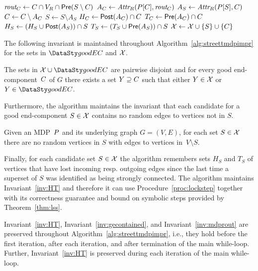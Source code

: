 \begin{algorithm2e}
{{{{				%
					$\textit{rout}_C \gets C \cap V_R \cap \mathsf{Pre}(S \setminus C)$\label{l:mimpr:lssrout}
					$A_C \gets \textit{Attr}_{R}(P[C], \textit{rout}_C)$\label{l:imdp:attr3}
					$A_S \gets \textit{Attr}_{R}(P[S], C)$\label{l:imdp:attr4}\;
					$C \gets C \setminus A_C$\label{l:mimpr:rem4}\;
					$S \gets S \setminus A_S$\label{l:mimpr:rem2}\;
					$H_C \gets \mathsf{Post}(A_C) \cap C$\label{l:imdp:lsshc}\;
					$T_C \gets \mathsf{Pre}(A_C) \cap C$\label{l:imdp:lsstc}\;
					$H_S \gets (H_S \cup \mathsf{Post}(A_S)) \cap S$\label{l:imdp:lsshs}\;
					$T_S \gets (T_S \cup \mathsf{Pre}(A_S)) \cap S$\label{l:imdp:lssts}\;
					$\mathcal{X} \gets \mathcal{X} \cup \{S\} \cup 
					\{C\}$\;
				}
			}
		}
	}
	\Return{$\as{\mdp, \Reach{\bigcup_{\scc \in \good} \scc}}$}\;
\end{algorithm2e}

The following invariant is maintained throughout Algorithm~\ref{alg:streettmdpimpr}
for the sets in $\good$ and $\mathcal{X}$.

\begin{invariant}\label{inv:gecontained}
The sets in $\mathcal{\ec} \cup \good$ are pairwise disjoint and for every good 
end-component~$C$ of $G$ there exists a set $Y \supseteq C$
such that either $Y \in \mathcal{X}$ or $Y \in \good$.
\end{invariant}

Furthermore, the algorithm maintains the invariant
that each candidate for a good end-component $S \in \mathcal{X}$
contains no random edges to vertices not in $S$.

\begin{invariant}\label{inv:mdprout}
Given an MDP~$P$ and its underlying graph $G = (V, E)$, for each
set $S \in \mathcal{X}$ there are no random vertices in $S$ with edges
to vertices in~$V \setminus S$.
\end{invariant}

Finally, for each candidate set $S \in \mathcal{X}$ the algorithm remembers
sets $H_S$ and $T_S$ of vertices that have lost incoming resp. outgoing
edges since the last time a superset of $S$ was identified as being strongly connected.
The algorithm maintains Invariant~\ref{inv:HT} and therefore it can use
Procedure~\ref{proc:lockstep} together with its correctness guarantee and bound
on symbolic steps provided by Theorem~\ref{thm:lss}.

\begin{lemma}\label{lem:improvedmdpsinv}
Invariant~\ref{inv:HT}, Invariant~\ref{inv:gecontained}, and Invariant~\ref{inv:mdprout}
are preserved throughout Algorithm~\ref{alg:streettmdpimpr}, i.e., they hold before the
first iteration, after each iteration, and after termination of the main while-loop. Further,
Invariant~\ref{inv:HT} is preserved during each iteration of the main while-loop.
\end{lemma}

